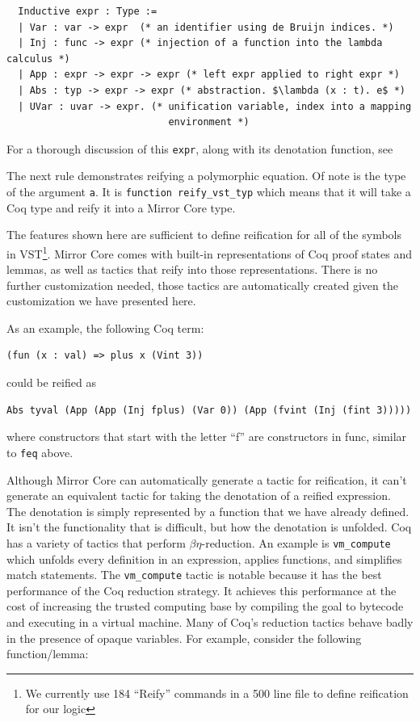 \documentclass{puthesis}
\begin{document}
\begin{lstlisting}
  Inductive expr : Type :=
  | Var : var -> expr  (* an identifier using de Bruijn indices. *)
  | Inj : func -> expr (* injection of a function into the lambda calculus *)
  | App : expr -> expr -> expr (* left expr applied to right expr *)
  | Abs : typ -> expr -> expr (* abstraction. $\lambda (x : t). e$ *)
  | UVar : uvar -> expr. (* unification variable, index into a mapping
                            environment *)
\end{lstlisting}

For a thorough discussion of this \lstinline|expr|, along with its
denotation function, see \cite[section~3.1]{malecha:thesis}

The next rule demonstrates reifying a polymorphic equation. Of note is
the type of the argument \lstinline|a|. It is 
\lstinline|function reify_vst_typ| which means that it will take a Coq
type and reify it into a Mirror Core type.

The features shown here are sufficient to define reification for all
of the symbols in VST\footnote{We currently use 184 ``Reify'' commands in a 500
  line file to define reification for our logic}. Mirror Core comes with built-in representations
of Coq proof states and lemmas, as well as tactics that reify into those
representations. There is no further customization needed, those
tactics are automatically created given the customization we have
presented here.

As an example, the following Coq term:

\begin{lstlisting}
(fun (x : val) => plus x (Vint 3))
\end{lstlisting}

could be reified as

\begin{lstlisting}
Abs tyval (App (App (Inj fplus) (Var 0)) (App (fvint (Inj (fint 3)))))
\end{lstlisting}

where constructors that start with the letter ``f'' are constructors
in func, similar to \lstinline|feq| above.

Although Mirror Core can automatically generate a tactic for
reification, it can't generate an equivalent tactic for taking the
denotation of a reified expression. The denotation is simply
represented by a function that we have already defined. It isn't the
functionality that is difficult, but how the denotation is
unfolded. Coq has a variety of tactics that perform
$\beta\eta$-reduction. An example is \lstinline|vm_compute| which unfolds
every definition in an expression, applies functions, and simplifies
match statements. The \lstinline|vm_compute| tactic is notable because
it has the best performance of the Coq reduction strategy. It achieves
this performance at the cost of increasing the trusted computing base
by compiling the goal to bytecode and executing in a virtual machine. 
Many of Coq's reduction tactics behave badly in the presence of opaque
variables. For example, consider the following function/lemma:
\end{document}
